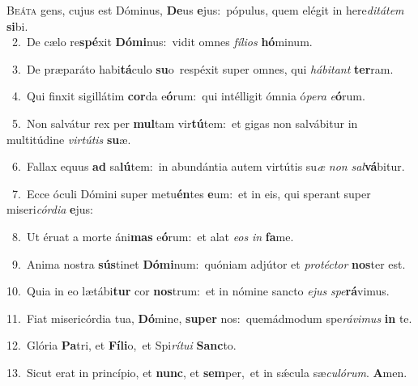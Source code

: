 \lettrine{\initial\textcolor{\initialcolor}{B}}{eáta} gens, cujus est Dóminus, \textbf{De}\-us \textbf{e}\-jus:~\star pópulus, quem elégit in here\-\textit{di}\-\textit{tá}\textit{tem} \textbf{si}\-bi.\\
{\numbfont\textcolor{\numbcolor}{~2.}}~De cælo re\-\textbf{spé}\-xit \textbf{Dó}\-\textbf{mi}nus:~\star vidit omnes \textit{fí}\-\textit{li}\textit{os} \textbf{hó}\-minum.\par
{\numbfont\textcolor{\numbcolor}{~3.}}~De præparáto habi\-\textbf{tá}\-culo \textbf{su}\-o~\star respéxit super omnes, qui \textit{há}\-\textit{bi}\textit{tant} \textbf{ter}\-ram.\par
{\numbfont\textcolor{\numbcolor}{~4.}}~Qui finxit sigillátim \textbf{cor}\-da e\-\textbf{ó}\-rum:~\star qui intélligit ómnia ó\-\textit{pe}\-\textit{ra} \textit{e}\-\textbf{ó}rum.\par
{\numbfont\textcolor{\numbcolor}{~5.}}~Non salvátur rex per \textbf{mul}\-tam vir\-\textbf{tú}\-tem:~\star et gigas non salvábitur in multitúdine \textit{vir}\-\textit{tú}\textit{tis} \textbf{su}\-æ.\par
{\numbfont\textcolor{\numbcolor}{~6.}}~Fallax equus \textbf{ad} sa\-\textbf{lú}\-tem:~\star in abundántia autem virtútis su\textit{æ} \textit{non} \textit{sal}\-\textbf{vá}bitur.\par
{\numbfont\textcolor{\numbcolor}{~7.}}~Ecce óculi Dómini super metu\-\textbf{én}\-tes \textbf{e}\-um:~\star et in eis, qui sperant super miseri\-\textit{cór}\-\textit{di}\textit{a} \textbf{e}\-jus:\par
{\numbfont\textcolor{\numbcolor}{~8.}}~Ut éruat a morte áni\textbf{mas} e\-\textbf{ó}\-rum:~\star et alat \textit{e}\-\textit{os} \textit{in} \textbf{fa}\-me.\par
{\numbfont\textcolor{\numbcolor}{~9.}}~Anima nostra \textbf{sús}\-tinet \textbf{Dó}\-\textbf{mi}num:~\star quóniam adjútor et \textit{pro}\-\textit{téc}\textit{tor} \textbf{nos}\-ter est.\par
{\numbfont\textcolor{\numbcolor}{10.}}~Quia in eo lætábi\textbf{tur} cor \textbf{nos}\-trum:~\star et in nómine sancto \textit{e}\-\textit{jus} \textit{spe}\-\textbf{rá}vimus.\par
{\numbfont\textcolor{\numbcolor}{11.}}~Fiat misericórdia tua, \textbf{Dó}\-mine, \textbf{su}\-\textbf{per} nos:~\star quemádmodum spe\-\textit{rá}\-\textit{vi}\textit{mus} \textbf{in} te.\par
{\numbfont\textcolor{\numbcolor}{12.}}~Glória \textbf{Pa}\-tri, et \textbf{Fí}\-\textbf{li}o,~\star et Spi\-\textit{rí}\-\textit{tu}\textit{i} \textbf{Sanc}\-to.\par
{\numbfont\textcolor{\numbcolor}{13.}}~Sicut erat in princípio, et \textbf{nunc}\-, et \textbf{sem}\-per,~\star et in sǽcula sæ\-\textit{cu}\-\textit{ló}\textit{rum}. \textbf{A}\-men.\par
